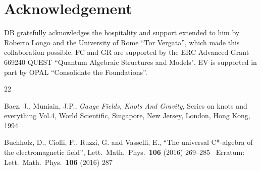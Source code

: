 \documentclass[11pt]{article}
\numberwithin{equation}{section}
\begin{document}
\section*{Acknowledgement}

\vspace*{-2mm}
DB  gratefully acknowledges the hospitality and support 
extended to him by Roberto Longo and 
the University of Rome ``Tor Vergata'', which made
this collaboration possible. 
FC and GR are supported by the ERC Advanced Grant 
669240 QUEST ``Quantum Algebraic Structures and Models". 
EV is supported in part by OPAL ``Consolidate the Foundations''. 



\begin{thebibliography}{22}
{\small 


 Baez, J., Muniain, J.P., 
{\it Gauge Fields, Knots And Gravity},
Series on knots and everything Vol.4,
World Scientific, Singapore, New Jersey, London, Hong Kong, 1994







 Buchholz, D., Ciolli, F., Ruzzi, G. and Vasselli, E., 
``The universal C*-algebra of the electromagnetic field'',
Lett.\ Math.\ Phys.\ {\bf 106} (2016) 269--285 \ 
Erratum: Lett.\ Math.\ Phys.\ {\bf 106} (2016) 287

}
\end{thebibliography}
\end{document}
